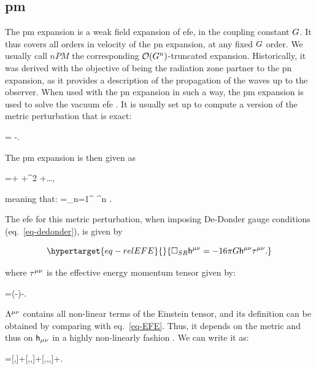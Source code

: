 \documentclass[
  11pt,
  a4paper,
  DIV=11,
  numbers=noendperiod,
  twoside]{scrreprt}
\let\[\relax \let\]\relax %
\DeclareRobustCommand{\[}{\begin{equation}}
\DeclareRobustCommand{\]}{\end{equation}}
\begin{document}
\hypertarget{pm}{%
\subsection{\texorpdfstring{\gls{pm}}{}}\label{pm}}

The \gls{pm} expansion is a weak field expansion of \gls{efe}, in the
coupling constant \(\grav\). It thus covers all orders in velocity of
the \gls{pn} expansion, at any fixed \(\grav\) order. We usually call
\(nPM\) the corresponding \(\order[n]{\grav}\)-truncated expansion.
Historically, it was derived with the objective of being the radiation
zone partner to the \gls{pn} expansion, as it provides a description of
the propagation of the waves up to the observer. When used with the
\gls{pn} expansion in such a way, the \gls{pm} expansion is used to
solve the vacuum \gls{efe} . It is usually set up to compute a version
of the metric perturbation that is exact:

\[\pertmet=\sqrt{-\metricTensor} \invmet-\invmink.\]

The \gls{pm} expansion is then given as

\[
\sqrt{-\metricTensor} \invmet=\invmink+ \grav {}+\grav^2 +\ldots,
\]

meaning that: \[
\invpertmet=\sum\limits_{n=1}^{\infty} \grav^n  .
\]

The \gls{efe} for this metric perturbation, when imposing De-Donder
gauge conditions (eq.~\ref{eq-dedonder}), is given by

\begin{equation}\protect\hypertarget{eq-relEFE}{}{
\SRDA \invpertmet=-16 \pi \grav \invpertmet \relSEct .
}\label{eq-relEFE}\end{equation}

where \(\relSEct\) is the effective energy momentum tensor given by:

\[
\relSEct=(-\metricTensor)\SEct -\inv{16 \pi \grav}\ct[\mu\nu]{\Lambda}.
\]

\(\ct[\mu\nu]{\Lambda}\) contains all non-linear terms of the Einstein
tensor, and its definition can be obtained by comparing with
eq.~\ref{eq-EFE}. Thus, it depends on the metric and thus on
\(\pertmet\) in a highly non-linearly fashion . We can write it as:

\[
\ct[\mu\nu]{\Lambda}=[\pertTensor,\pertTensor]+[\pertTensor,\pertTensor,\pertTensor]+[\pertTensor,\pertTensor,\pertTensor,\pertTensor]+\order[5]{\pertTensor}.
\]
\end{document}
